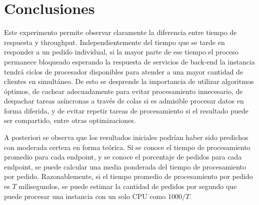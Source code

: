 \documentclass[11pt]{scrartcl}
\begin{document}
\section{Conclusiones}\label{sec:conclusions}

Este experimento permite observar claramente la diferencia entre tiempo de respuesta y throughput. Independientemente del tiempo que se tarde en responder a un pedido individual, si la mayor parte de ese tiempo el proceso permanece bloqueado esperando la respuesta de servicios de back-end la instancia tendrá ciclos de procesador disponibles para atender a una mayor cantidad de clientes en simultáneo. De esto se desprende la importancia de utilizar algoritmos óptimos, de cachear adecuadamente para evitar procesamiento innecesario, de despachar tareas asíncronas a través de colas si es admisible procesar datos en forma diferida, y de evitar repetir tareas de procesamiento si el resultado puede ser compartido, entre otras optimizaciones.

A posteriori se observa que los resultados iniciales podrían haber sido predichos con moderada certeza en forma teórica. Si se conoce el tiempo de procesamiento promedio para cada endpoint, y se conoce el porcentaje de pedidos para cada endpoint, se puede calcular una media ponderada del tiempo de procesamiento por pedido. Razonablemente, si el tiempo promedio de procesamiento por pedido es $T$ milisegundos, se puede estimar la cantidad de pedidos por segundo que puede procesar una instancia con un solo CPU como $1000/T$.
\end{document}
